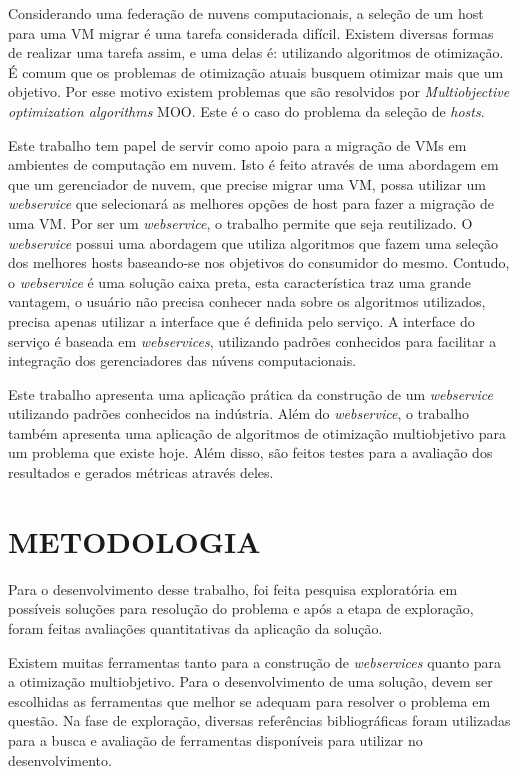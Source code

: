 Considerando uma federação de nuvens computacionais, a seleção de um host para uma VM migrar é
uma tarefa considerada difícil. Existem diversas formas de realizar uma tarefa assim, e uma delas é:
utilizando algoritmos de otimização. É comum que os problemas de otimização atuais busquem otimizar
mais que um objetivo. Por esse motivo existem problemas que são resolvidos por \textit{Multiobjective
optimization algorithms} MOO. Este é o caso do problema da seleção de \textit{hosts}.

Este trabalho tem papel de servir como apoio para a migração de VMs em ambientes de computação em nuvem. 
Isto é feito através de uma abordagem em que um gerenciador de nuvem, que precise migrar uma VM, possa 
utilizar um \textit{webservice} que selecionará as melhores opções de host para fazer a migração de uma VM. 
Por ser um \textit{webservice}, o trabalho permite que seja reutilizado. O \textit{webservice} possui uma abordagem que 
utiliza algoritmos que fazem uma seleção dos melhores hosts baseando-se 
nos objetivos do consumidor do mesmo. Contudo, o \textit{webservice} é uma solução caixa preta, esta característica 
traz uma grande vantagem, o usuário não precisa conhecer nada sobre os algoritmos utilizados, 
precisa apenas utilizar a interface que é definida pelo serviço. A interface do serviço é baseada em
\textit{webservices}, utilizando padrões conhecidos para facilitar a integração dos gerenciadores
das núvens computacionais.

Este trabalho apresenta uma aplicação prática da construção de um \textit{webservice} utilizando padrões conhecidos
na indústria. Além do \textit{webservice}, o trabalho também apresenta uma aplicação de algoritmos de otimização multiobjetivo
para um problema que existe hoje. Além disso, são feitos testes para a avaliação dos resultados e gerados métricas através deles.

\section{METODOLOGIA}

Para o desenvolvimento desse trabalho, foi feita pesquisa exploratória em possíveis
soluções para resolução do problema e após a etapa de exploração, foram feitas
avaliações quantitativas da aplicação da solução.

Existem muitas ferramentas tanto para a construção de \textit{webservices} quanto
para a otimização multiobjetivo. Para o desenvolvimento de uma solução, devem 
ser escolhidas as ferramentas que melhor se adequam para resolver o problema em questão.
Na fase de exploração, diversas referências bibliográficas foram utilizadas para 
a busca e avaliação de ferramentas disponíveis para utilizar no desenvolvimento. 

